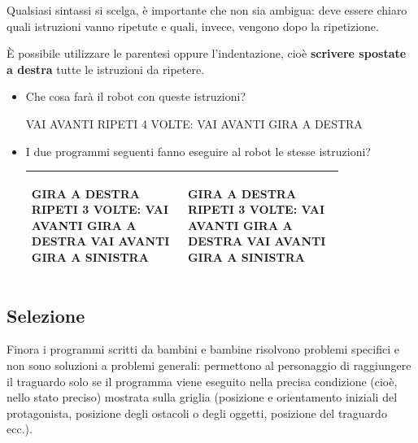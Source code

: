 Qualsiasi sintassi si scelga, è importante che non sia ambigua: deve essere chiaro quali istruzioni vanno ripetute e quali, invece, vengono dopo la ripetizione.

È possibile utilizzare le parentesi oppure l'indentazione, cioè \textbf{scrivere spostate a destra} tutte le istruzioni da ripetere.

\begin{domandestimolo}

\begin{itemize}
\item Che cosa farà il robot con queste istruzioni?

\begin{pseudocodice}
VAI AVANTI
RIPETI 4 VOLTE:
    VAI AVANTI
    GIRA A DESTRA
\end{pseudocodice}

\item I due programmi seguenti fanno eseguire al robot le stesse istruzioni?


\begin{tabular}{|p{0.4\linewidth}|p{0.4\linewidth}|}
\hline
\begin{minipage}[t]{\linewidth}
\begin{pseudocodice}
GIRA A DESTRA
RIPETI 3 VOLTE:
    VAI AVANTI
GIRA A DESTRA
VAI AVANTI
GIRA A SINISTRA
\end{pseudocodice}
\end{minipage}
&
\begin{minipage}[t]{\linewidth}
\begin{pseudocodice}
GIRA A DESTRA
RIPETI 3 VOLTE:
    VAI AVANTI
    GIRA A DESTRA
    VAI AVANTI
    GIRA A SINISTRA
\end{pseudocodice}
\end{minipage} \\
\hline
\end{tabular}

\end{itemize}
\end{domandestimolo}

\subsection{Selezione }\label{selezione}

Finora i programmi scritti da bambini e bambine risolvono problemi specifici e non sono soluzioni a problemi generali: permettono al personaggio di raggiungere il traguardo solo se il programma viene eseguito nella precisa condizione (cioè, nello stato preciso) mostrata sulla griglia (posizione e orientamento iniziali del protagonista, posizione degli ostacoli o degli oggetti, posizione del traguardo ecc.).

